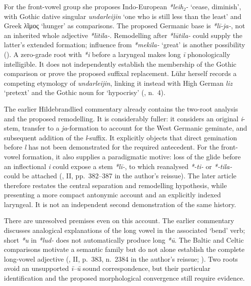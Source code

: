 \documentclass[
  british,
  a4paper,
]{article}
\begin{document}
For the front-vowel group she proposes Indo-European \emph{*leih₂-}
`cease, diminish', with Gothic dative singular \emph{undarleijin} `one
who is still less than the least' and Greek λῖμος `hunger' as
comparisons. The proposed Germanic base is \emph{*lī-ja-}, not an
inherited whole adjective \emph{*lītila-}. Remodelling after
\emph{*lūtila-} could supply the latter's extended formation; influence
from \emph{*mekila-} `great' is another possibility
(). A zero-grade root with
\emph{*i} before a laryngeal makes long \emph{ī} phonologically
intelligible. It does not independently establish the membership of the
Gothic comparison or prove the proposed suffixal replacement. Lühr
herself records a competing etymology of \emph{undarleijin}, linking it
instead with High German \emph{liz} `pretext' and the Gothic noun for
`hypocrisy' (, n.~4).

The earlier Hildebrandlied commentary already contains the two-root
analysis and the proposed remodelling. It is considerably fuller: it
considers an original \emph{i}-stem, transfer to a \emph{ja}-formation
to account for the West Germanic geminate, and subsequent addition of
the \emph{l}-suffix. It explicitly objects that direct gemination before
\emph{l} has not been demonstrated for the required antecedent. For the
front-vowel formation, it also supplies a paradigmatic motive: loss of
the glide before an inflectional \emph{i} could expose a stem
\emph{*lī-}, to which reanalysed \emph{*-ti-} or \emph{*-tila-} could be
attached (, II, pp.~382--387 in the
author's reissue). The later article therefore restates the central
separation and remodelling hypothesis, while presenting a more compact
antonymic account and an explicitly indexed laryngeal. It is not an
independent second demonstration of the same history.

There are unresolved premises even on this account. The earlier
commentary discusses analogical explanations of the long vowel in the
associated `bend' verb; short \emph{*u} in \emph{*lud-} does not
automatically produce long \emph{*ū}. The Baltic and Celtic comparisons
motivate a semantic family but do not alone establish the complete
long-vowel adjective (, II, p.~383,
n.~2384 in the author's reissue; ). Two roots avoid an unsupported \emph{ī}--\emph{ū} sound
correspondence, but their particular identification and the proposed
morphological convergence still require evidence.
\end{document}
